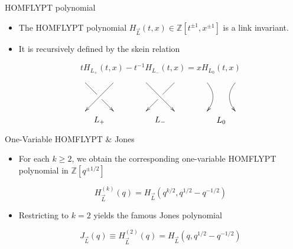 \documentclass[slideColor]{prosper}
\renewcommand{\>}{\rangle}
\newcommand{\<}{\langle}
\begin{document}

\begin{slide}{HOMFLYPT polynomial}

\begin{itemize}
\item The HOMFLYPT polynomial $H_{\overrightarrow{L}}(t,x) \in \mathbb{Z}[t^{\pm 1},x^{\pm 1}]$ is a link invariant.

\bigskip
\item It is recursively defined by the skein relation

\bigskip
\[
t H_{L_{+}}(t,x) - t^{-1} H_{L_{-}}(t,x) = 
x H_{L_{0}}(t,x)
\]

\bigskip
\[
\xy
(6,6)*{}="tl";
(-6,6)*{}="tr";
(6,-6)*{}="bl";
(-6,-6)*{}="br";
{\ar|{\hole \; } "tr";"bl"};
{\ar "tl";"br"};
(0,-10)*{L_{+}};
\endxy
\qquad \qquad
\xy
(-6,6)*{}="tl";
(6,6)*{}="tr";
(-6,-6)*{}="bl";
(6,-6)*{}="br";
{\ar|{\hole \; } "tr";"bl"};
{\ar "tl";"br"};
(0,-10)*{L_{-}};
\endxy
\qquad\qquad 
 \xy
(-6,6)*{}="tl";
(6,6)*{}="tr";
(-6,-6)*{}="bl";
(6,-6)*{}="br";
"tl";"bl" **\crv{(-1,0)}?(1)*\dir{>};
"tr";"br" **\crv{(1,0)}?(1)*\dir{>};
(0,-10)*{L_{0}};
\endxy
\]

\end{itemize}

\end{slide}


\begin{slide}{One-Variable HOMFLYPT \& Jones}

\begin{itemize}
\item For each $k\ge 2$, we obtain the corresponding one-variable HOMFLYPT polynomial in $\mathbb{Z}[q^{\pm 1/2}]$

\bigskip
\[
H^{(k)}_{\overrightarrow{L}}(q) = H_{\overrightarrow{L}}(q^{k/2},q^{1/2} - q^{-1/2})
\]

\bigskip
\item Restricting to $k=2$ yields the famous Jones polynomial

\bigskip
\[
J_{\overrightarrow{L}}(q) \equiv H^{(2)}_{\overrightarrow{L}}(q) = H_{\overrightarrow{L}}(q,q^{1/2} - q^{-1/2})
\]

\end{itemize}

\end{slide}

\end{document}

